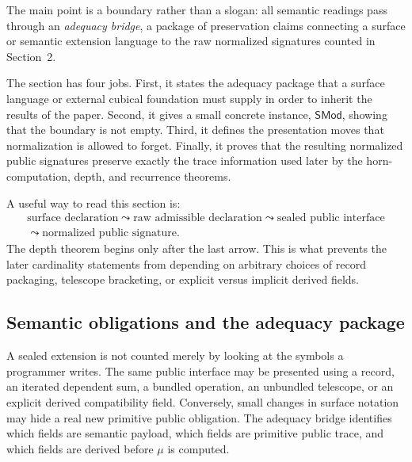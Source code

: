 \documentclass{lmcs}
\begin{document}
The main point is a boundary rather than a slogan: all semantic readings pass through an
\emph{adequacy bridge}, a package of preservation claims connecting a surface or semantic
extension language to the raw normalized signatures counted in Section~2.

The section has four jobs.  First, it states the adequacy package that a surface language or
external cubical foundation must supply in order to inherit the results of the paper.  Second,
it gives a small concrete instance, \(\mathsf{SMod}\), showing that the boundary is not empty.
Third, it defines the presentation moves that normalization is allowed to forget.  Finally, it
proves that the resulting normalized public signatures preserve exactly the trace information
used later by the horn-computation, depth, and recurrence theorems.

A useful way to read this section is:
\[
\begin{gathered}
\text{surface declaration}
\leadsto
\text{raw admissible declaration}
\leadsto
\text{sealed public interface}\\
\leadsto
\text{normalized public signature}.
\end{gathered}
\]
The depth theorem begins only after the last arrow.  This is what prevents the later
cardinality statements from depending on arbitrary choices of record packaging, telescope
bracketing, or explicit versus implicit derived fields.

\subsection{Semantic obligations and the adequacy package}

A sealed extension is not counted merely by looking at the symbols a programmer writes.  The
same public interface may be presented using a record, an iterated dependent sum, a bundled
operation, an unbundled telescope, or an explicit derived compatibility field.  Conversely,
small changes in surface notation may hide a real new primitive public obligation.  The
adequacy bridge identifies which fields are semantic payload, which fields are primitive
public trace, and which fields are derived before \(\mu\) is computed.
\end{document}
